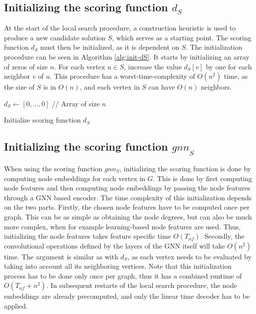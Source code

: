 \documentclass[draft,final]{vutinfth} %
\begin{document}
\subsection{Initializing the scoring function $d_S$}

At the start of the local search procedure, a construction heuristic is used to produce a new candidate solution $S$, which serves as a starting point. 
The scoring function $d_S$ must then be initialized, as it is dependent on $S$. The initialization procedure can be seen in Algorithm \ref{alg:init-dS}.
It starts by initializing an array of zeros of size $n$. For each vertex $u \in S$, increase the value $d_S[v]$ by one for each neighbor $v$ of $u$. This procedure has a worst-time-complexity of $O(n^2)$ time, as the size of $S$ is in $O(n)$, and each vertex in $S$ can have $O(n)$ neighbors. 

\begin{algorithm}
    \DontPrintSemicolon
    $d_S \gets [0, \dots, 0]$ // Array of size $n$ \;
    \caption{Initialize scoring function $d_S$}
    \label{alg:init-dS}
\end{algorithm}

\subsection{Initializing the scoring function $\mathit{gnn}_S$}

When using the scoring function $gnn_S$, initializing the scoring function is done by computing node embeddings for each vertex in $G$. This is done by first computing node features and then computing node embeddings by passing the node features through a GNN based encoder. The time complexity of this initialization depends on the two parts. Firstly, the chosen node features have to be computed once per graph. This can be as simple as obtaining the node degrees, but can also be much more complex, when for example learning-based node features are used. Thus, initializing the node features takes feature specific time $O(T_{nf})$. Secondly, the convolutional operations defined by the layers of the GNN itself will take $O(n^2)$ time. The argument is similar as with $d_S$, as each vertex needs to be evaluated by taking into account all its neighboring vertices. 
Note that this initialization process has to be done only once per graph, thus it has a combined runtime of $O(T_{nf} + n^2)$. In subsequent restarts of the local search procedure, the node embeddings are already precomputed, and only the linear time decoder has to be applied. 
\end{document}
